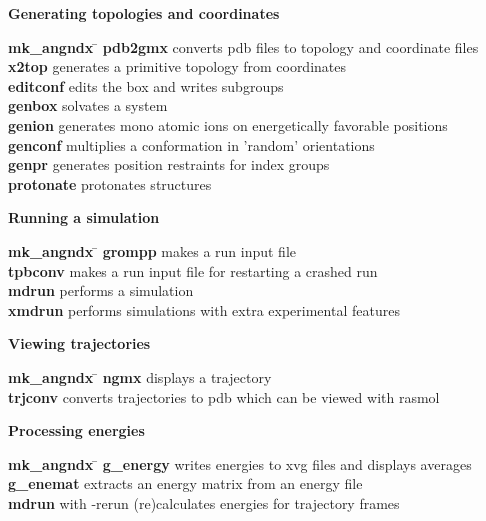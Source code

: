 \begin{description}
\item {\large\bf Generating topologies and coordinates}
\vspace{-2ex}\begin{tabbing}
{\bf mk\_angndx} \= \kill
{\bf pdb2gmx} \> converts pdb files to topology and coordinate files \\
{\bf x2top} \> generates a primitive topology from coordinates  \\
{\bf editconf} \> edits the box and writes subgroups  \\
{\bf genbox} \> solvates a system \\
{\bf genion} \> generates mono atomic ions on energetically favorable positions \\
{\bf genconf} \> multiplies a conformation in 'random' orientations \\
{\bf genpr} \> generates position restraints for index groups \\
{\bf protonate} \> protonates structures \\
\end{tabbing}\vspace{-2ex}

\item {\large\bf Running a simulation}
\vspace{-2ex}\begin{tabbing}
{\bf mk\_angndx} \= \kill
{\bf grompp} \> makes a run input file \\
{\bf tpbconv} \> makes a run input file for restarting a crashed run \\
{\bf mdrun} \> performs a simulation \\
{\bf xmdrun} \> performs simulations with extra experimental features \\
\end{tabbing}\vspace{-2ex}

\item {\large\bf Viewing trajectories}
\vspace{-2ex}\begin{tabbing}
{\bf mk\_angndx} \= \kill
{\bf ngmx} \> displays a trajectory \\
{\bf trjconv} \> converts trajectories to {\eg} pdb which can be viewed with {\eg} rasmol \\
\end{tabbing}\vspace{-2ex}

\item {\large\bf Processing energies}
\vspace{-2ex}\begin{tabbing}
{\bf mk\_angndx} \= \kill
{\bf g\_energy} \> writes energies to xvg files and displays averages \\
{\bf g\_enemat} \> extracts an energy matrix from an energy file \\
{\bf mdrun} \> with -rerun (re)calculates energies for trajectory frames \\
\end{tabbing}\vspace{-2ex}


\end{description}
